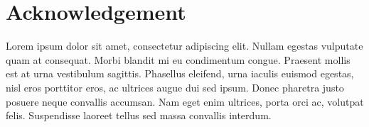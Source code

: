 \documentclass[../thesis.tex]{subfiles}
\begin{document}
\chapter*{Acknowledgement}

Lorem ipsum dolor sit amet, consectetur adipiscing elit. Nullam egestas vulputate quam at consequat. Morbi blandit mi eu condimentum congue. Praesent mollis est at urna vestibulum sagittis. Phasellus eleifend, urna iaculis euismod egestas, nisl eros porttitor eros, ac ultrices augue dui sed ipsum. Donec pharetra justo posuere neque convallis accumsan. Nam eget enim ultrices, porta orci ac, volutpat felis. Suspendisse laoreet tellus sed massa convallis interdum.
\end{document}
